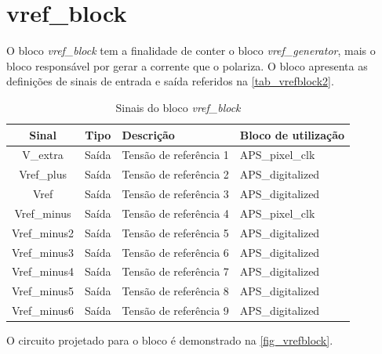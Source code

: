 \renewcommand{\NomeBloco}{\emph{vref\_block}}
\newcommand{\NomeBlocoA}{vrefblock}
\renewcommand{\NomePTab}{tab_\NomeBlocoA}
\renewcommand{\NomeSTab}{tab_\NomeBlocoA2}
\renewcommand{\NomePFig}{fig_\NomeBlocoA}
\renewcommand{\NomeSFig}{fig_\NomeBlocoA2}
\renewcommand{\NomeTTab}{tab_\NomeBlocoA3}

\section{vref\_block}

O bloco \NomeBloco{} tem a finalidade de conter o bloco \emph{vref\_generator}, mais o bloco respons\'avel por gerar a corrente que o polariza. O bloco apresenta as definições de sinais de entrada e sa\'ida referidos na \autoref{\NomeSTab}.

\begin{table}[!h] 
\caption{Sinais do bloco \NomeBloco}
\label{\NomeSTab}
\centering
\begin{tabular}{ccll}

    \toprule
    Sinal & Tipo    & Descrição & Bloco de utilização     \\
    \midrule \midrule
    V\_extra   & Saída   & Tensão de refer\^encia 1 & APS\_pixel\_clk \\
    \midrule
    Vref\_plus   & Saída   & Tensão de refer\^encia 2 & APS\_digitalized\\
    \midrule
    Vref   & Saída   & Tensão de refer\^encia 3 & APS\_digitalized \\
    \midrule
    Vref\_minus   & Saída   & Tensão de refer\^encia 4 & APS\_pixel\_clk \\
    \midrule
    Vref\_minus2   & Saída   & Tensão de refer\^encia 5 & APS\_digitalized \\
    \midrule
    Vref\_minus3   & Saída   & Tensão de refer\^encia 6 & APS\_digitalized \\
    \midrule
    Vref\_minus4  & Saída   & Tensão de refer\^encia 7 & APS\_digitalized \\
    \midrule
    Vref\_minus5   & Saída   & Tensão de refer\^encia 8 & APS\_digitalized \\
    \midrule
    Vref\_minus6   & Saída   & Tensão de refer\^encia 9 & APS\_digitalized \\
    \bottomrule
\end{tabular}
\end{table}

O circuito projetado para o bloco \'e demonstrado na \autoref{\NomePFig}.

